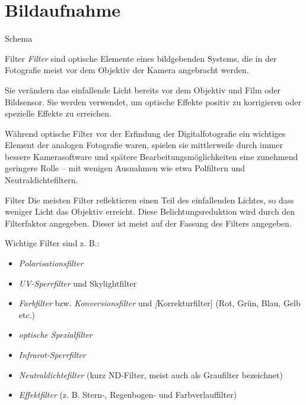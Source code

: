 \section{Bildaufnahme}

\begin{defi}[Kamera]{Schema}

\end{defi}

\begin{defi}[Kamera]{Filter}
    \emph{Filter} sind optische Elemente eines bildgebenden Systems, die in der Fotografie meist vor dem Objektiv der Kamera angebracht werden.

    Sie verändern das einfallende Licht bereits vor dem Objektiv und Film oder Bildsensor.
    Sie werden verwendet, um optische Effekte positiv zu korrigieren oder spezielle Effekte zu erreichen.

    Während optische Filter vor der Erfindung der Digitalfotografie ein wichtiges Element der analogen Fotografie waren, spielen sie mittlerweile durch immer bessere Kamerasoftware und spätere Bearbeitungsmöglichkeiten eine zunehmend geringere Rolle -- mit wenigen Ausnahmen wie etwa Polfiltern und Neutraldichtefiltern.
\end{defi}

\begin{example}[Kamera]{Filter}
    Die meisten Filter reflektieren einen Teil des einfallenden Lichtes, so dass weniger Licht das Objektiv erreicht.
    Diese Belichtungsreduktion wird durch den Filterfaktor angegeben.
    Dieser ist meist auf der Fassung des Filters angegeben.

    Wichtige Filter sind z. B.:
    \begin{itemize}
        \item \emph{Polarisationsfilter}
        \item \emph{UV-Sperrfilter} und Skylightfilter
        \item \emph{Farbfilter} bzw. \emph{Konversionsfilter} und \emph[Korrekturfilter] (Rot, Grün, Blau, Gelb etc.)
        \item \emph{optische Spezialfilter}
        \item \emph{Infrarot-Sperrfilter}
        \item \emph{Neutraldichtefilter} (kurz ND-Filter, meist auch als Graufilter bezeichnet)
        \item \emph{Effektfilter} (z. B. Stern-, Regenbogen- und Farbverlauffilter)
    \end{itemize}
\end{example}

